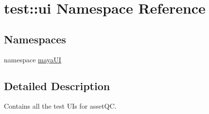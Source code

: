 \hypertarget{namespacetest_1_1ui}{\section{test\-:\-:ui \-Namespace \-Reference}
\label{d2/da6/namespacetest_1_1ui}
}
\subsection*{\-Namespaces}
\begin{DoxyCompactItemize}
\item 
namespace \hyperlink{namespacetest_1_1ui_1_1mayaUI}{maya\-U\-I}
\end{DoxyCompactItemize}


\subsection{\-Detailed \-Description}
\begin{DoxyVerb}
Contains all the test UIs for assetQC.
\end{DoxyVerb}
 